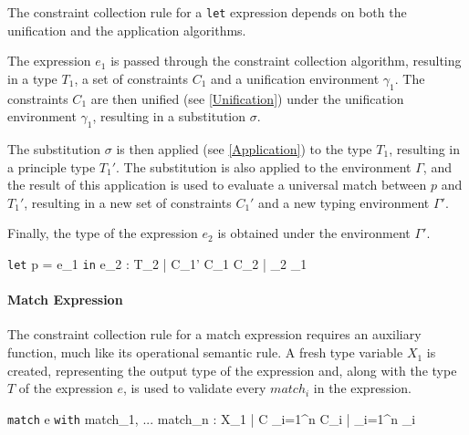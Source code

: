 \documentclass[class=article, crop=false]{standalone}
\begin{document}
The constraint collection rule for a \texttt{let} expression depends on both the unification and the application algorithms.

The expression $e_1$ is passed through the constraint collection algorithm, resulting in a type $T_1$, a set of constraints $C_1$ and a unification environment $\gamma_1$.
The constraints $C_1$ are then unified (see \ref{Unification}) under the unification environment $\gamma_1$, resulting in a substitution $\sigma$.

The substitution $\sigma$ is then applied (see \ref{Application}) to the type $T_1$, resulting in a principle type $T_1'$.
The substitution is also applied to the environment $\Gamma$, and the result of this application is used to evaluate a universal match between $p$ and $T_1'$, resulting in a new set of constraints $C_1'$ and a new typing environment $\Gamma'$.

Finally, the type of the expression $e_2$ is obtained under the environment $\Gamma'$.

    {\Gamma \vdash \texttt{let} \; p = e_1 \; \texttt{in} \; e_2 : T_2 \; | \; C_1' \cup C_1 \cup C_2  \; | \; \gamma_2 \cup \gamma_1}

\paragraph{Match Expression}

The constraint collection rule for a match expression requires an auxiliary function, much like its operational semantic rule.
A fresh type variable $X_1$ is created, representing the output type of the expression and, along with the type $T$ of the expression $e$, is used to validate every $match_i$ in the expression.

    {\Gamma \vdash \texttt{match} \; e \; \texttt{with} \; match_1, ... \; match_n : X_1 \; | \; C \cup \displaystyle \bigcup_{i=1}^{n} C_i \; | \; \gamma \cup \displaystyle \bigcup_{i=1}^{n} \gamma_i}
\end{document}
